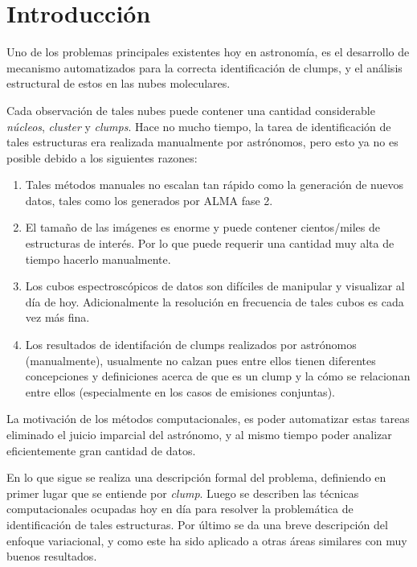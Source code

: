 \chapter{Introducción}

Uno de los problemas principales  existentes hoy en astronomía, es el desarrollo de mecanismo automatizados para la correcta identificación de clumps, y el análisis estructural de estos en las nubes moleculares.

Cada observación de tales nubes puede contener una cantidad considerable \textit{núcleos}, \textit{cluster} y \textit{clumps}. Hace no mucho tiempo, la tarea de identificación de tales estructuras era realizada manualmente por astrónomos, pero esto ya no es posible debido a los siguientes razones:
\begin{enumerate}
    \item Tales métodos manuales no escalan tan rápido como la generación de nuevos datos, tales como los generados por ALMA fase 2.
    \item El tamaño de las imágenes es enorme y puede contener cientos/miles de estructuras de interés. Por lo que puede requerir una cantidad muy alta de tiempo hacerlo manualmente.
    \item Los cubos espectroscópicos de datos son difíciles de manipular y visualizar al día de hoy. Adicionalmente la resolución en frecuencia de tales cubos es cada vez más fina.
    \item Los resultados de identifación de clumps realizados por astrónomos (manualmente), usualmente no calzan pues entre ellos tienen diferentes concepciones y definiciones acerca de que es un clump y la cómo se relacionan entre ellos (especialmente en los casos de emisiones conjuntas).
\end{enumerate}

La motivación de los métodos computacionales, es poder automatizar estas tareas eliminado el juicio imparcial del astrónomo, y al mismo tiempo poder analizar eficientemente gran cantidad de datos.

En lo que sigue se realiza una descripción formal del problema, definiendo en primer lugar que se entiende por \textit{clump}. Luego se describen las técnicas computacionales ocupadas hoy en día para resolver la problemática de identificación de tales estructuras.  Por último se da una breve descripción del enfoque variacional, y como este ha sido aplicado a otras áreas similares con muy buenos resultados.